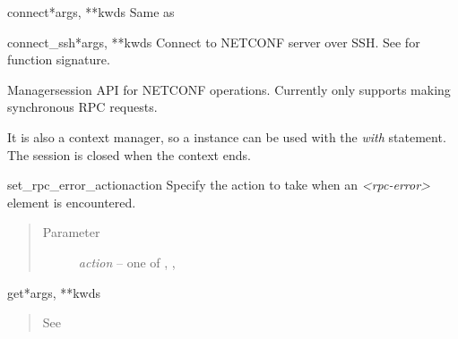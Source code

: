 \documentclass[a4paper,10pt,english]{manual}
\begin{document}
\hypertarget{ncclient.manager.connect}{}\begin{funcdesc}{connect}{*args, **kwds}
Same as \hyperlink{ncclient.manager.connect_ssh}{}
\end{funcdesc}

\hypertarget{ncclient.manager.connect_ssh}{}\begin{funcdesc}{connect\_ssh}{*args, **kwds}
Connect to NETCONF server over SSH. See \hyperlink{ncclient.transport.SSHSession.connect}{} for function signature.
\end{funcdesc}

\hypertarget{ncclient.manager.Manager}{}\begin{classdesc}{Manager}{session}
API for NETCONF operations. Currently only supports making synchronous
RPC requests.

It is also a context manager, so a \hyperlink{ncclient.manager.Manager}{} instance can be used
with the \emph{with} statement. The session is closed when the context ends.

\hypertarget{ncclient.manager.Manager.set_rpc_error_action}{}\begin{methoddesc}{set\_rpc\_error\_action}{action}
Specify the action to take when an \emph{\textless{}rpc-error\textgreater{}} element is encountered.
\begin{quote}\begin{description}
\item[Parameter]
\emph{action} -- one of \hyperlink{ncclient.manager.RAISE_ALL}{}, \hyperlink{ncclient.manager.RAISE_ERR}{}, \hyperlink{ncclient.manager.RAISE_NONE}{}

\end{description}\end{quote}
\end{methoddesc}

\hypertarget{ncclient.manager.Manager.get}{}\begin{methoddesc}{get}{*args, **kwds}~\begin{quote}\begin{description}
\item[See]
\hyperlink{ncclient.operations.Get.request}{}


\end{description}
\end{quote}
\end{methoddesc}
\end{classdesc}
\end{document}
